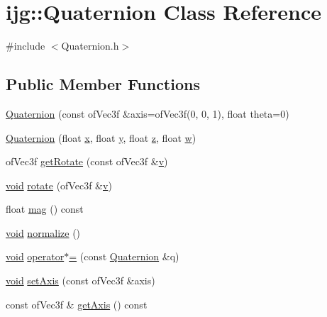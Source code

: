 \hypertarget{classijg_1_1_quaternion}{\section{ijg\-:\-:Quaternion Class Reference}
\label{classijg_1_1_quaternion}
}


{\ttfamily \#include $<$Quaternion.\-h$>$}

\subsection*{Public Member Functions}
\begin{DoxyCompactItemize}
\item 
\hyperlink{classijg_1_1_quaternion_ae10432deb8607c654e8c0b2991c0c5e8}{Quaternion} (const of\-Vec3f \&axis=of\-Vec3f(0, 0, 1), float theta=0)
\item 
\hyperlink{classijg_1_1_quaternion_af1293ea7f1913326a47270aa3a2092fe}{Quaternion} (float \hyperlink{gl3_8h_a92d0386e5c19fb81ea88c9f99644ab1d}{x}, float \hyperlink{gl3_8h_a66ddd433d2cacfe27f5906b7e86faeed}{y}, float \hyperlink{gl3_8h_acb78bf1972d3eaf07da34ff2e0a2f133}{z}, float \hyperlink{gl3_8h_a1d0296e9e835f2e1ee17634af95fc1ec}{w})
\item 
of\-Vec3f \hyperlink{classijg_1_1_quaternion_adf9e1b2a22b48558081ea4431ecf5b40}{get\-Rotate} (const of\-Vec3f \&\hyperlink{gl3_8h_a14cfbe2fc2234f5504618905b69d1e06}{v})
\item 
\hyperlink{glutf90_8h_ac778d6f63f1aaf8ebda0ce6ac821b56e}{void} \hyperlink{classijg_1_1_quaternion_a94d667fcbac1ced532698a3c55b034a6}{rotate} (of\-Vec3f \&\hyperlink{gl3_8h_a14cfbe2fc2234f5504618905b69d1e06}{v})
\item 
float \hyperlink{classijg_1_1_quaternion_ac5456b45a7eff794fbf2644002695798}{mag} () const 
\item 
\hyperlink{glutf90_8h_ac778d6f63f1aaf8ebda0ce6ac821b56e}{void} \hyperlink{classijg_1_1_quaternion_a48e6bafb249c895ed25f29dc9170e11e}{normalize} ()
\item 
\hyperlink{glutf90_8h_ac778d6f63f1aaf8ebda0ce6ac821b56e}{void} \hyperlink{classijg_1_1_quaternion_aa667e7d9d797a11ac0511226fdf49e58}{operator$\ast$=} (const \hyperlink{classijg_1_1_quaternion}{Quaternion} \&q)
\item 
\hyperlink{glutf90_8h_ac778d6f63f1aaf8ebda0ce6ac821b56e}{void} \hyperlink{classijg_1_1_quaternion_a212e143c26f7c7fe02ec2a9a7ab80726}{set\-Axis} (const of\-Vec3f \&axis)
\item 
const of\-Vec3f \& \hyperlink{classijg_1_1_quaternion_a6b7bd36aa1f92283d482fa8b3c891bcd}{get\-Axis} () const 
\end{DoxyCompactItemize}
